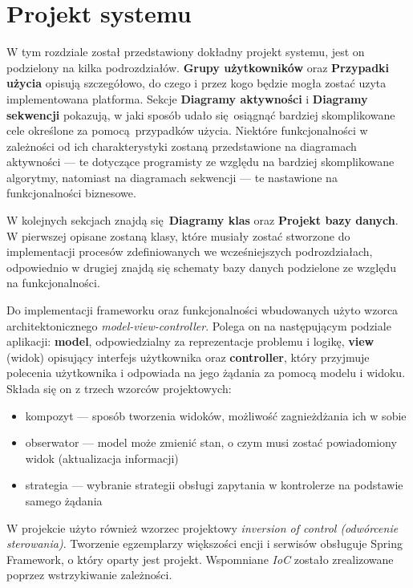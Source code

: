 
\chapter{Projekt systemu}
\thispagestyle{chapterBeginStyle}

W tym rozdziale został przedstawiony dokładny projekt systemu, jest on podzielony na kilka podrozdziałów. \textbf{Grupy użytkowników} oraz \textbf{Przypadki użycia} opisują szczegółowo, do czego i przez kogo będzie mogła zostać uzyta implementowana platforma. Sekcje \textbf{Diagramy aktywności} i \textbf{Diagramy sekwencji} pokazują, w jaki sposób udało się osiągnąć bardziej skomplikowane cele określone za pomocą przypadków użycia. Niektóre funkcjonalności w zależności od ich charakterystyki zostaną przedstawione na diagramach aktywności — te dotyczące programisty ze względu na bardziej skomplikowane algorytmy, natomiast na diagramach sekwencji — te nastawione na funkcjonalności biznesowe.

W kolejnych sekcjach znajdą się \textbf{Diagramy klas} oraz \textbf{Projekt bazy danych}. W pierwszej opisane zostaną klasy, które musiały zostać stworzone do implementacji procesów zdefiniowanych we wcześniejszych podrozdziałach, odpowiednio w drugiej znajdą się schematy bazy danych podzielone ze względu na funkcjonalności.

Do implementacji frameworku oraz funkcjonalności wbudowanych użyto wzorca architektonicznego \textit{model-view-controller}. Polega on na następującym podziale aplikacji: \textbf{model}, odpowiedzialny za reprezentacje problemu i logikę, \textbf{view} (widok) opisujący interfejs użytkownika oraz \textbf{controller}, który przyjmuje polecenia użytkownika i odpowiada na jego żądania za pomocą modelu i widoku. Składa się on z trzech wzorców projektowych:
\begin{itemize}
	\item kompozyt — sposób tworzenia widoków, możliwość zagnieżdżania ich w sobie
	\item obserwator — model może zmienić stan, o czym musi zostać powiadomiony widok (aktualizacja informacji)
	\item strategia — wybranie strategii obsługi zapytania w kontrolerze na podstawie samego żądania
\end{itemize}
W projekcie użyto również wzorzec projektowy \textit{inversion of control (odwórcenie sterowania)}. Tworzenie egzemplarzy większości encji i serwisów obsługuje Spring Framework, o który oparty jest projekt. Wspomniane \textit{IoC} zostało zrealizowane poprzez wstrzykiwanie zależności. 

